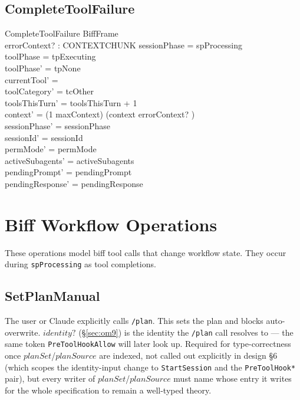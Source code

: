 \documentclass[a4paper,10pt,fleqn]{article}
\begin{document}
\subsection{CompleteToolFailure}

\begin{schema}{CompleteToolFailure}
  BiffFrame \\
  errorContext? : CONTEXTCHUNK
  \where
  sessionPhase = spProcessing \\
  toolPhase = tpExecuting \\
  toolPhase' = tpNone \\
  currentTool' = \emptyset \\
  toolCategory' = tcOther \\
  toolsThisTurn' = toolsThisTurn + 1 \\
  context' = (1 \upto maxContext) \dres (context \cat \langle errorContext? \rangle) \\
  sessionPhase' = sessionPhase \\
  sessionId' = sessionId \\
  permMode' = permMode \\
  activeSubagents' = activeSubagents \\
  pendingPrompt' = pendingPrompt \\
  pendingResponse' = pendingResponse
\end{schema}

\section{Biff Workflow Operations}

These operations model biff tool calls that change workflow state.
They occur during \texttt{spProcessing} as tool completions.

\subsection{SetPlanManual}

The user or Claude explicitly calls \texttt{/plan}. This sets the
plan and blocks auto-overwrite. $identity?$ (\S\ref{sec:om9}) is the
identity the \texttt{/plan} call resolves to --- the same token
\texttt{PreToolHookAllow} will later look up.  Required for
type-correctness once $planSet$/$planSource$ are indexed, not called
out explicitly in design \S6 (which scopes the identity-input change to
\texttt{StartSession} and the \texttt{PreToolHook*} pair), but every
writer of $planSet$/$planSource$ must name whose entry it writes for the
whole specification to remain a well-typed theory.
\end{document}
